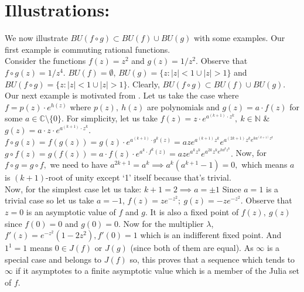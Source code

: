 \documentclass[a4paper,12pt]{amsart}
\numberwithin{equation}{section}
\begin{document}
\section{Illustrations:}
We now illustrate  $BU(f \circ g)\subset BU(f)\cup BU(g)$ with some examples. Our first example is commuting rational functions. \\
Consider the functions $f(z)=z^2$ and $g(z)=1/z^2$. Observe that $f \circ g(z)=1/z^4$. $BU(f)= \emptyset$, $BU(g)=\{z: |z|<1 \cup |z|>1\}$ and $BU(f \circ g)=\{z:|z|<1 \cup |z|>1\}.$ Clearly, $BU(f \circ g)\subset BU(f)\cup BU(g)$.
\\
Our next example is motivated from  \cite{tw}. Let us take the case where $f= p(z)\cdot e^{h(z)}$ where $p(z) , \ h(z)$ are polynomials and $g(z)=a \cdot f(z)$ for some $a \in  \mathbb{C}\setminus \{0\}$. For simplicity, let us take
$f(z)=z\cdot e^{a^{(k+1)} \cdot z^k},\ k \in \mathbb{N}$ \&
$g(z)=a \cdot z \cdot e^{a^{(k+1)} \cdot z^k}$.\\
$f \circ g(z) =f(g(z))=g(z)\cdot e^{a^{(k+1)} \cdot g^k(z)}=aze^{a^{(k+1)}z^k}e^{a^{(2k+1)}z^ke^{ka^{(k+1)}z^k}}$\\
$g \circ f(z) =g(f(z))=a \cdot f(z)\cdot e^{a^k \cdot f^k(z)}= aze^{a^kz^k}e^{a^{2k}z^ke^{ka^kz^k}}.$ Now, for $f \circ g = g \circ f,$ we need to have $a^{2k+1}=a^k \implies a^k(a^{k+1}-1)=0,$ which means $a$ is $(k+1)$-root of unity except `1' itself because that's trivial. 
\\
Now, for the simplest case let us take: $k+1=2 \implies a =\pm 1$ Since $a=1$ is a trivial case so let us take $a=-1$, $f(z)=ze^{-z^2};\ g(z)=-ze^{-z^2}$. 
 Observe that  $z=0$ is an asymptotic value of $f$ and $g$. It is also  a fixed point of $f(z), \ g(z)$ since $f(0)=0$ and $g(0)=0$. Now for the multiplier $\lambda$, $f'(z)=e^{-z^2}(1-2z^2), f'(0)=1$ which is an indifferent fixed point. And $1^1=1$ means $0\in J(f)$ or $J(g)$ (since both of them are equal). As $\infty$ is a special case and belongs to $J(f)$ so, this proves  that a sequence which tends to  $\infty$ if it asymptotes to a finite asymptotic value which is a member of the Julia set of $f$. 
\end{document}
